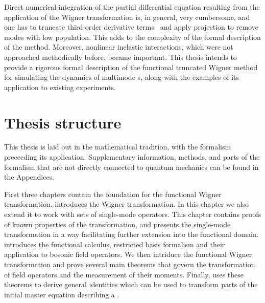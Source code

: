 Direct numerical integration of the partial differential equation resulting from the application of the Wigner transformation is, in general, very cumbersome, and one has to truncate third-order derivative terms~\cite{Drummond1993,Steel1998,Sinatra2002} and apply projection to remove modes with low population.
This adds to the complexity of the formal description of the method.
Moreover, nonlinear inelastic interactions, which were not approached methodically before, became important.
This thesis intends to provide a rigorous formal description of the functional truncated Wigner method for simulating the dynamics of multimode s, along with the examples of its application to existing experiments.


\section{Thesis structure}

This thesis is laid out in the mathematical tradition, with the formalism preceeding its application.
Supplementary information, methods, and parts of the formalism that are not directly connected to quantum mechanics can be found in the Appendices.

First three chapters contain the foundation for the functional Wigner transformation.
 introduces the Wigner transformation.
In this chapter we also extend it to work with sets of single-mode operators.
This chapter contains proofs of known properties of the transformation, and presents the single-mode transformation in a way facilitating further extension into the functional domain.
 introduces the functional calculus, restricted basis formalism and their application to bosonic field operators.
We then intriduce the functional Wigner transformation and prove several main theorems that govern the transformation of field operators and the measurement of their moments.
Finally,  uses these theorems to derive general identities which can be used to transform parts of the initial master equation describing a .

